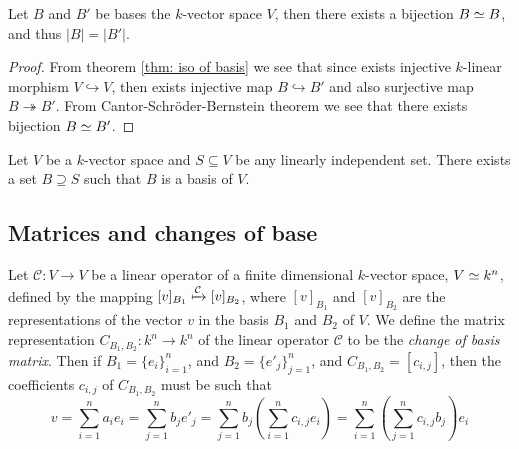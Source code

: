 \begin{lemma}
  Let \(B\) and \(B'\) be bases the \(k\)-vector space \(V\), then there exists
  a bijection \(B \simeq B\), and thus \(|B| = |B'|\).
\end{lemma}

\begin{proof}
  From theorem \cref{thm: iso of basis} we see that since exists injective
  \(k\)-linear morphism \(V \hookrightarrow V\), then exists injective map \(B
  \hookrightarrow B'\) and also surjective map \(B \twoheadrightarrow B'\). From
  Cantor-Schröder-Bernstein theorem we see that there exists bijection \(B \simeq
  B'\).
\end{proof}

\begin{proposition}\label{prop: li to basis}
  Let \(V\) be a \(k\)-vector space and \(S \subseteq V\) be any linearly
  independent set. There exists a set \(B \supseteq S\) such that \(B\) is a
  basis of \(V\).
\end{proposition}


\subsection{Matrices and changes of base}

\begin{definition}
  \label{def: change of basis matrix}
  Let \(\mathcal C : V \to V\) be a linear operator of a finite dimensional
  \(k\)-vector space, \(V \simeq k^n\), defined by the mapping \([v]_{B_1}
  \xmapsto{\mathcal C} [v]_{B_2}\), where \([v]_{B_1}\) and \([v]_{B_2}\) are the
  representations of the vector \(v\) in the basis \(B_1\) and \(B_2\) of \(V\).
  We define the matrix representation \(C_{B_1, B_2} : k^n \to k^n\) of the
  linear operator \(\mathcal C\) to be the \emph{change of basis matrix}. Then
  if \(B_1 = \{e_i\}_{i=1}^n\), and \(B_2 = \{e'_j\}_{j=1}^n\), and \(C_{B_1,
  B_2} = [c_{i, j}]\), then the coefficients \(c_{i, j}\) of \(C_{B_1, B_2}\)
  must be such that
  \[
    v = \sum_{i=1}^n a_i e_i = \sum_{j=1}^n b_j e'_j
    = \sum_{j=1}^n b_j \left( \sum_{i=1}^n c_{i, j} e_i \right)
    = \sum_{i=1}^n \left( \sum_{j=1}^n c_{i, j} b_j \right) e_i
  \]
\end{definition}

